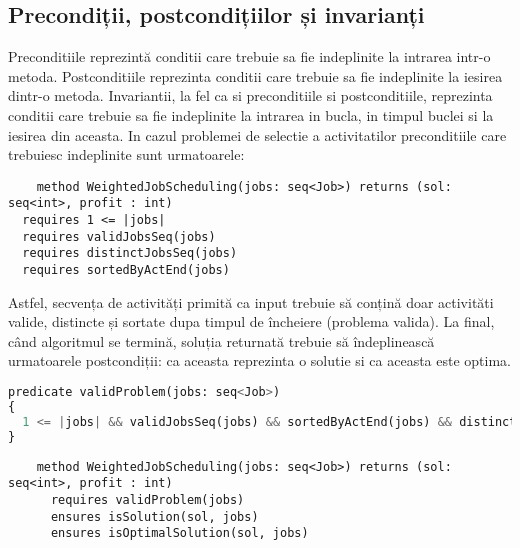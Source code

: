 \subsection{Precondiții, postcondițiilor și invarianți}
Preconditiile reprezintă conditii care trebuie sa fie indeplinite la intrarea intr-o metoda. Postconditiile reprezinta conditii care trebuie sa fie indeplinite la iesirea dintr-o metoda.
Invariantii, la fel ca si preconditiile si postconditiile, reprezinta conditii care trebuie sa fie indeplinite la intrarea in bucla, in timpul buclei si la iesirea din aceasta. In cazul problemei de selectie a activitatilor preconditiile care trebuiesc indeplinite sunt urmatoarele:
\begin{lstlisting}
    method WeightedJobScheduling(jobs: seq<Job>) returns (sol: seq<int>, profit : int)
  requires 1 <= |jobs|
  requires validJobsSeq(jobs)
  requires distinctJobsSeq(jobs)
  requires sortedByActEnd(jobs)
\end{lstlisting}
Astfel, secvența de activități primită ca input trebuie să conțină doar activităti valide, distincte și sortate dupa timpul de încheiere (problema valida). 
La final, când algoritmul se termină, soluția returnată trebuie să îndeplinească urmatoarele postcondiții: ca aceasta reprezinta o solutie si ca aceasta este optima. 

\begin{lstlisting}[language=Python]
    predicate validProblem(jobs: seq<Job>)
{
  1 <= |jobs| && validJobsSeq(jobs) && sortedByActEnd(jobs) && distinctJobsSeq(jobs)
}

\end{lstlisting}
\begin{lstlisting}
    method WeightedJobScheduling(jobs: seq<Job>) returns (sol: seq<int>, profit : int)
      requires validProblem(jobs)
      ensures isSolution(sol, jobs)
      ensures isOptimalSolution(sol, jobs)
\end{lstlisting}

